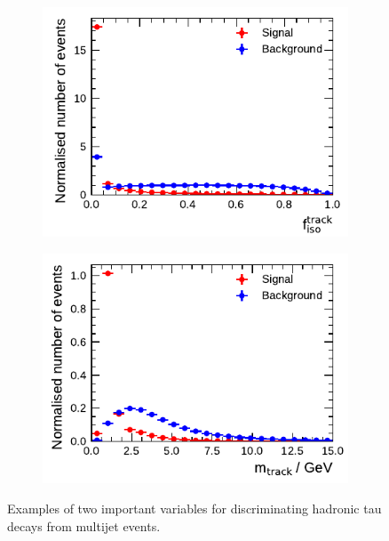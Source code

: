 \begin{figure}[t]
  \begin{subfigure}[t]{0.48\textwidth}
    \centering
    \includegraphics{./figures/baseline_bdt_vars/1p/SumPtTrkFrac.pdf}
    \label{fig:sumpttrkfrac}
  \end{subfigure}\hfill
  \begin{subfigure}[t]{0.48\textwidth}
    \centering
    \includegraphics{./figures/baseline_bdt_vars/3p/massTrkSys.pdf}
    \label{fig:masstrksys}
  \end{subfigure}
  \caption{Examples of two important variables for discriminating hadronic tau
    decays from multijet events.}
  \label{fig:bdt_discriminants}
\end{figure}


